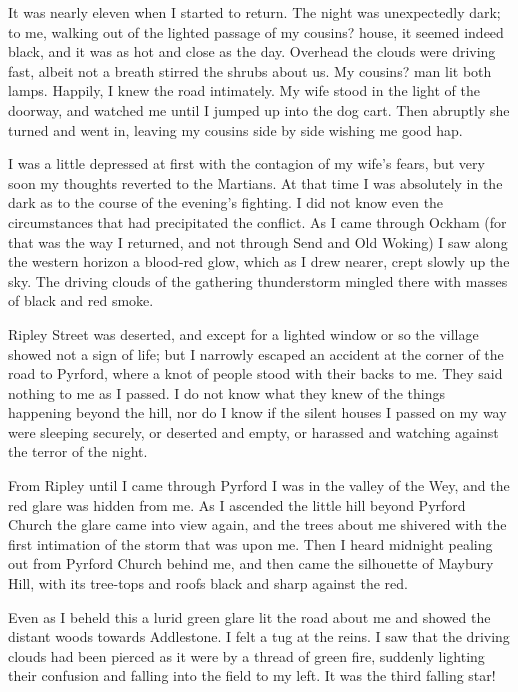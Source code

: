 It was nearly eleven when I started to return. The night was
unexpectedly dark; to me, walking out of the lighted passage of my
cousins? house, it seemed indeed black, and it was as hot and close
as the day. Overhead the clouds were driving fast, albeit not a
breath stirred the shrubs about us. My cousins? man lit both lamps.
Happily, I knew the road intimately. My wife stood in the light of
the doorway, and watched me until I jumped up into the dog cart.
Then abruptly she turned and went in, leaving my cousins side by
side wishing me good hap.

I was a little depressed at first with the contagion of my wife's
fears, but very soon my thoughts reverted to the Martians. At that
time I was absolutely in the dark as to the course of the evening's
fighting. I did not know even the circumstances that had
precipitated the conflict. As I came through Ockham (for that was
the way I returned, and not through Send and Old Woking) I saw
along the western horizon a blood-red glow, which as I drew nearer,
crept slowly up the sky. The driving clouds of the gathering
thunderstorm mingled there with masses of black and red smoke.

Ripley Street was deserted, and except for a lighted window or so
the village showed not a sign of life; but I narrowly escaped an
accident at the corner of the road to Pyrford, where a knot of
people stood with their backs to me. They said nothing to me as I
passed. I do not know what they knew of the things happening beyond
the hill, nor do I know if the silent houses I passed on my way
were sleeping securely, or deserted and empty, or harassed and
watching against the terror of the night.

From Ripley until I came through Pyrford I was in the valley of the
Wey, and the red glare was hidden from me. As I ascended the little
hill beyond Pyrford Church the glare came into view again, and the
trees about me shivered with the first intimation of the storm that
was upon me. Then I heard midnight pealing out from Pyrford Church
behind me, and then came the silhouette of Maybury Hill, with its
tree-tops and roofs black and sharp against the red.

Even as I beheld this a lurid green glare lit the road about me and
showed the distant woods towards Addlestone. I felt a tug at the
reins. I saw that the driving clouds had been pierced as it were by
a thread of green fire, suddenly lighting their confusion and
falling into the field to my left. It was the third falling star!

